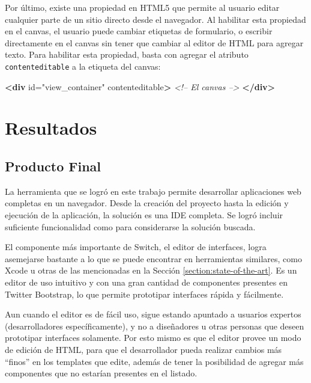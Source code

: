 \documentclass[12pt,spanish,letter]{report}
\newenvironment{Shaded}{}{}
\newcommand{\KeywordTok}[1]{\textcolor[rgb]{0.00,0.44,0.13}{\textbf{{#1}}}}
\newcommand{\StringTok}[1]{\textcolor[rgb]{0.25,0.44,0.63}{{#1}}}
\newcommand{\CommentTok}[1]{\textcolor[rgb]{0.38,0.63,0.69}{\textit{{#1}}}}
\newcommand{\OtherTok}[1]{\textcolor[rgb]{0.00,0.44,0.13}{{#1}}}
\begin{document}
Por último, existe una propiedad en HTML5 que permite al usuario editar
cualquier parte de un sitio directo desde el navegador. Al habilitar
esta propiedad en el canvas, el usuario puede cambiar etiquetas de
formulario, o escribir directamente en el canvas sin tener que cambiar
al editor de HTML para agregar texto. Para habilitar esta propiedad,
basta con agregar el atributo \texttt{contenteditable} a la etiqueta del
canvas:

\begin{Shaded}
\begin{Highlighting}[]
\KeywordTok{<div}\OtherTok{ id=}\StringTok{"view_container"}\OtherTok{ contenteditable}\KeywordTok{>}
  \CommentTok{<!-- El canvas -->}
\KeywordTok{</div>}
\end{Highlighting}
\end{Shaded}

\clearpage
\newpage

\chapter{Resultados}

\label{sections:results}

\section{Producto Final}

La herramienta que se logró en este trabajo permite desarrollar
aplicaciones web completas en un navegador. Desde la creación del
proyecto hasta la edición y ejecución de la aplicación, la solución es
una IDE completa. Se logró incluir suficiente funcionalidad como para
considerarse la solución buscada.

El componente más importante de Switch, el editor de interfaces, logra
asemejarse bastante a lo que se puede encontrar en herramientas
similares, como Xcode u otras de las mencionadas en la Sección
\ref{section:state-of-the-art}. Es un editor de uso intuitivo y con una
gran cantidad de componentes presentes en Twitter Bootstrap, lo que
permite prototipar interfaces rápida y fácilmente.

Aun cuando el editor es de fácil uso, sigue estando apuntado a usuarios
expertos (desarrolladores específicamente), y no a diseñadores u otras
personas que deseen prototipar interfaces solamente. Por esto mismo es
que el editor provee un modo de edición de HTML, para que el
desarrollador pueda realizar cambios más ``finos'' en los templates que
edite, además de tener la posibilidad de agregar más componentes que no
estarían presentes en el listado.
\end{document}
